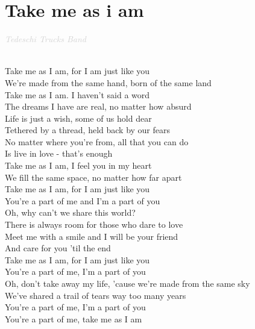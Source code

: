 \documentclass[a5paper, 10pt]{book}
\begin{document}
\section{Take me as i am}\textcolor{lightgray}{\textit{Tedeschi Trucks Band}}\\~\\
\begin{minipage}[t]{0.8\textwidth}
Take me as I am, for I am just like you\\
We're made from the same hand, born of the same land\\
Take me as I am. I haven't said a word\\
The dreams I have are real, no matter how absurd\\

\hspace*{5mm}Life is just a wish, some of us hold dear\\
\hspace*{5mm}Tethered by a thread, held back by our fears\\
\hspace*{5mm}No matter where you're from, all that you can do\\
\hspace*{5mm}Is live in love - that's enough\\

Take me as I am, I feel you in my heart\\
We fill the same space, no matter how far apart\\
Take me as I am, for I am just like you\\
You're a part of me and I'm a part of you\\

\hspace*{5mm}Oh, why can't we share this world?\\
\hspace*{5mm}There is always room for those who dare to love\\
\hspace*{5mm}Meet me with a smile and I will be your friend\\
\hspace*{5mm}And care for you 'til the end\\

Take me as I am, for I am just like you\\
You're a part of me, I'm a part of you\\
Oh, don't take away my life, 'cause we're made from the same sky\\
We've shared a trail of tears way too many years\\

You're a part of me, I'm a part of you\\
You're a part of me, take me as I am\\

\end{minipage}
\end{document}
